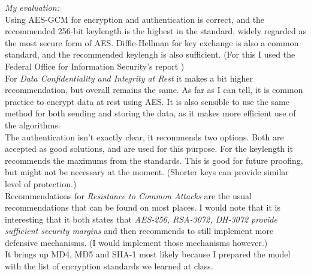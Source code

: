 \documentclass{article}
\begin{document}
\begin{enumerate}[label=\textbf{Task \arabic*:}]
		\textit{My evaluation:}\\
		Using AES-GCM for encryption and authentication is correct, and the recommended 256-bit keylength is the highest in the standard, widely regarded as the most secure form of AES. Diffie-Hellman for key exchange is also a common standard, and the recommended keylengh is also sufficient. (For this I used the Federal Office for Information Security's report \cite{bsi} ) \\
		For \emph{Data Confidentiality and Integrity at Rest} it makes a bit higher recommendation, but overall remains the same. As far as I can tell, it is common practice to encrypt data at rest using AES. It is also sensible to use the same method for both sending and storing the data, as it makes more efficient use of the algorithms.\\
		The authentication isn't exactly clear, it recommends two options. Both are accepted as good solutions, and are used for this purpose. For the keylength it recommends the maximums from the standards. This is good for future proofing, but might not be necessary at the moment. (Shorter keys can provide similar level of protection.)\\
		Recommendations for \emph{Resistance to Common Attacks} are the usual recommendations that can be found on most places. I would note that it is interesting that it both states that \textit{AES-256, RSA-3072, DH-3072 provide sufficient security margins} and then recommends to still implement more defensive mechanisms. (I would implement those mechanisms however.)\\
		It brings up MD4, MD5 and SHA-1 most likely because I prepared the model with the list of encryption standards we learned at class.
	\end{enumerate}
	
	\printbibliography
\end{document}

